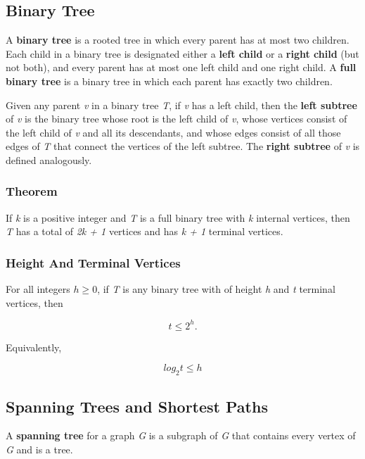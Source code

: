 \documentclass{article}
\begin{document}
\subsection{Binary Tree}
A \textbf{binary tree} is a rooted tree in which every parent has at most two children. Each child in a binary tree is designated either a \textbf{left child} or a \textbf{right child} (but not both), and every parent has at most one left child and one right child. A \textbf{full binary tree} is a binary tree in which each parent has exactly two children.

Given any parent \textit{v} in a binary tree \textit{T}, if \textit{v} has a left child, then the \textbf{left subtree} of \textit{v} is the binary tree whose root is the left child of \textit{v}, whose vertices consist of the left child of \textit{v} and all its descendants, and whose edges consist of all those edges of \textit{T} that connect the vertices of the left subtree. The \textbf{right subtree} of \textit{v} is defined analogously.

\subsubsection{Theorem}
If \textit{k} is a positive integer and \textit{T} is a full binary tree with \textit{k} internal vertices, then \textit{T} has a total of \textit{2k + 1} vertices and has \textit{k + 1} terminal vertices.

\subsubsection{Height And Terminal Vertices}
For all integers $h \geq 0$, if \textit{T} is any binary tree with of height \textit{h} and \textit{t} terminal vertices, then

\begin{equation}
t \leq 2^h.
\end{equation}

Equivalently,

\begin{equation}
log _2 t \leq h
\end{equation}

\subsection{Spanning Trees and Shortest Paths}
A \textbf{spanning tree} for a graph \textit{G} is a subgraph of \textit{G} that contains every vertex of \textit{G} and is a tree.
\end{document}
